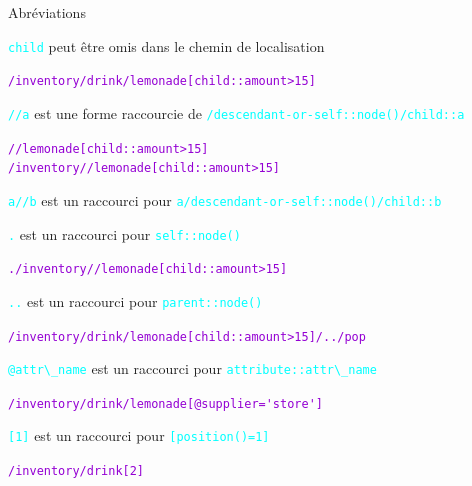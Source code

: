 \begin{frame}{Abr\'eviations}

\textcolor{cyan}{\verb?child?} peut \^etre omis dans le chemin de localisation\\

\begin{flushright}
\textcolor{DarkViolet}{\verb?/inventory/drink/lemonade[child::amount>15]?}
\end{flushright}


\textcolor{cyan}{\verb?//a?} est une forme raccourcie de \textcolor{cyan}{\verb?/descendant-or-self::node()/child::a?}\\
\begin{flushright}
\textcolor{DarkViolet}{\verb?//lemonade[child::amount>15]?\\
\verb?/inventory//lemonade[child::amount>15]?}
\end{flushright}


\textcolor{cyan}{\verb?a//b?} est un raccourci pour \textcolor{cyan}{\verb?a/descendant-or-self::node()/child::b?}\\

\bigskip

\textcolor{cyan}{\verb?.?} est un raccourci pour \textcolor{cyan}{\verb?self::node()?}\\

\begin{flushright}
\textcolor{DarkViolet}{\verb?./inventory//lemonade[child::amount>15]?}
\end{flushright}

\textcolor{cyan}{\verb?..?} est un raccourci pour \textcolor{cyan}{\verb?parent::node()?}\\

\begin{flushright}
\textcolor{DarkViolet}{\verb?/inventory/drink/lemonade[child::amount>15]/../pop?}
\end{flushright}

\textcolor{cyan}{\verb?@attr\_name?} est un raccourci pour \textcolor{cyan}{\verb?attribute::attr\_name?}\\

\begin{flushright}
\textcolor{DarkViolet}{\verb?/inventory/drink/lemonade[@supplier='store']?}
\end{flushright}

\textcolor{cyan}{\verb?[1]?} est un raccourci pour \textcolor{cyan}{\verb?[position()=1]?}

\begin{flushright}
\textcolor{DarkViolet}{\verb?/inventory/drink[2]?}
\end{flushright}

\end{frame}

